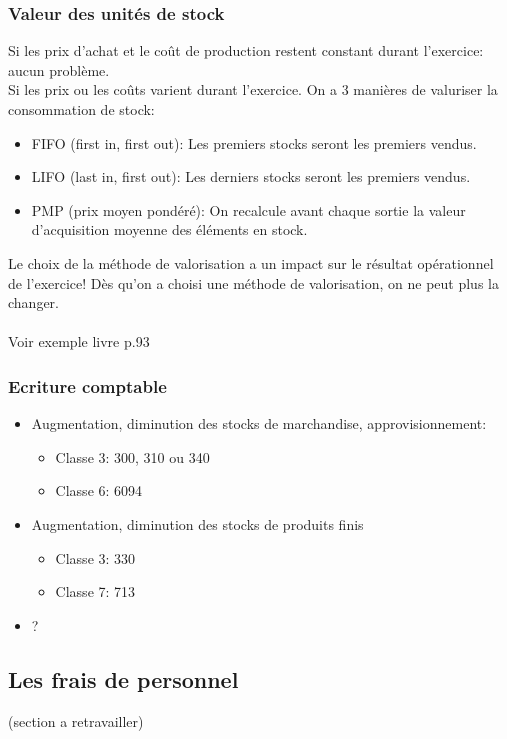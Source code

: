 \documentclass{article}
\begin{document}
\subsubsection*{Valeur des unités de stock}
Si les prix d'achat et le coût de production restent constant durant l'exercice: aucun problème. \\
Si les prix ou les coûts varient durant l'exercice. On a 3 manières de valuriser la consommation de stock:
\begin{itemize}
    \item FIFO (first in, first out): Les premiers stocks seront les premiers vendus.
    \item LIFO (last in, first out): Les derniers stocks seront les premiers vendus.
    \item PMP (prix moyen pondéré): On recalcule avant chaque sortie la valeur d'acquisition moyenne des éléments en stock.
\end{itemize}
Le choix de la méthode de valorisation a un impact sur le résultat opérationnel de l'exercice! Dès qu'on a choisi une méthode de valorisation, on ne peut plus la changer.\\ \\
Voir exemple livre p.93\\
\subsubsection*{Ecriture comptable}
\begin{itemize}
    \item Augmentation, diminution des stocks de marchandise, approvisionnement:
    \begin{itemize}
        \item Classe 3: 300, 310 ou 340
        \item Classe 6: 6094
    \end{itemize}
    \item Augmentation, diminution des stocks de produits finis
    \begin{itemize}
        \item Classe 3: 330
        \item Classe 7: 713
    \end{itemize}
    \item ?
\end{itemize}

\subsection{Les frais de personnel}
(section a retravailler)
\end{document}
